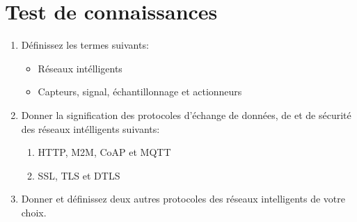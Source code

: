 \section*{Test de connaissances \MarksOne}
\begin{enumerate}
    \item Définissez les termes suivants:
          \begin{itemize}
              \item Réseaux intélligents
              \item Capteurs, signal, échantillonnage et actionneurs
          \end{itemize}
    \item Donner la signification des protocoles d'échange de données, de et de sécurité des réseaux intélligents suivants:
          \begin{enumerate}
              \item HTTP, M2M, CoAP et MQTT
              \item SSL, TLS et DTLS
          \end{enumerate}
    \item Donner et définissez deux autres protocoles des réseaux intelligents de votre choix.
\end{enumerate}